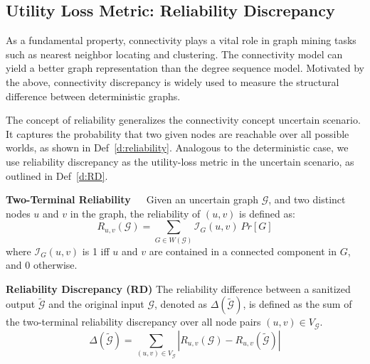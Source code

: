 \subsection{Utility Loss Metric: Reliability Discrepancy}

As a fundamental property, connectivity plays a vital role in graph mining tasks such as nearest neighbor locating and clustering. 
The connectivity model can yield a better graph representation than the degree sequence model. 
Motivated by the above, connectivity discrepancy is widely used to measure the structural difference between deterministic graphs. 

The concept of reliability generalizes the connectivity concept uncertain scenario. 
It captures the probability that two given nodes are reachable over all possible worlds, as shown in Def~\ref{d:reliability}. 
Analogous to the deterministic case, we use reliability discrepancy as the utility-loss metric in the uncertain scenario, as outlined in Def~\ref{d:RD}. 
\begin{definition}
    \textbf{Two-Terminal Reliability~\cite{Colbourn_Colbourn_1987}}~~Given an uncertain graph $\mathcal{G}$, and two distinct nodes $u$ and $v$ in the graph, the reliability of $(u,v)$ is defined as:
        \begin{equation*}
                R_{u,v}(\mathcal{G})= \sum_{G \in W(\mathcal{G})} \mathcal{I}_{G}(u,v) ~ Pr[G] 
        \end{equation*}
    where $\mathcal{I}_{G}(u,v)$ is 1 iff $u$ and $v$ are contained in a connected component in $G$, and 0 otherwise.   
    \label{d:reliability}
\end{definition}

\theoremstyle{definition}
\begin{definition}
    \textbf{Reliability Discrepancy (RD)}
    The reliability difference between a sanitized output $\tilde{\mathcal{G}}$ and the original input $\mathcal{G}$, 
    denoted as $\Delta(\tilde{\mathcal{G}})$, 
    is defined as the sum of the two-terminal reliability discrepancy over all node pairs $(u,v) \in V_\mathcal{G}$.
    \begin{equation*}
        \Delta(\tilde{\mathcal{G}})=\sum_{(u,v) \in V_\mathcal{G} }|R_{u,v}(\mathcal{G})-R_{u,v}(\tilde{\mathcal{G}})|
    \end{equation*}
    \label{d:RD}
\end{definition}


